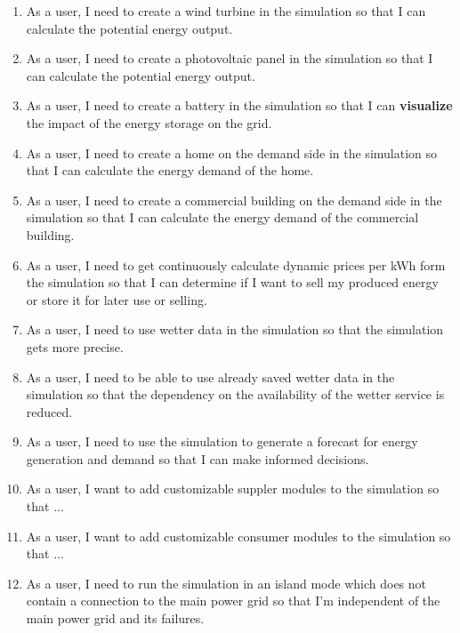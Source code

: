 \begin{enumerate}
\item As a user, I need to create a wind turbine in the simulation so that I can calculate the potential energy output.

\item As a user, I need to create a photovoltaic panel in the simulation so that I can calculate the potential energy output.

\item As a user, I need to create a battery in the simulation so that I can \textbf{visualize} the impact of the energy storage on the grid.

\item As a user, I need to create a home on the demand side in the simulation so that I can calculate the energy demand of the home.

\item As a user, I need to create a commercial building on the demand side in the simulation so that I can calculate the energy demand of the commercial building.

\item As a user, I need to  get continuously calculate dynamic prices per kWh form the simulation so that I can determine if I want to sell my produced energy or store it for later use or selling.


\item As a user, I need to use wetter data in the simulation so that the simulation gets more precise.

\item As a user, I need to be able to use already saved wetter data in the simulation so that the dependency on the availability of the wetter service is reduced.

\item As a user, I need to use the simulation to generate a forecast for energy generation and demand so that I can make informed decisions.

\item As a user, I want to add customizable suppler modules to the simulation so that ...

\item As a user, I want to add customizable consumer modules to the simulation so that ...

\item As a user, I need to run the simulation in an island mode which does not contain a connection to the main power grid so that I'm independent of the main power grid and its failures.


\end{enumerate}
